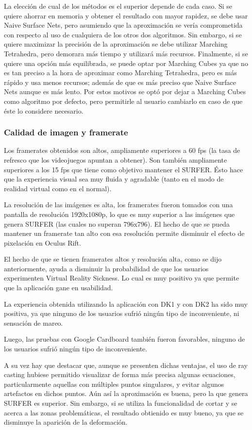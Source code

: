 \documentclass[12pt]{article}
\begin{document}
La elección de cual de los métodos es el superior depende de cada caso. Si se quiere ahorrar en memoria y obtener el resultado con mayor rapidez, se debe usar Naive Surface Nets, pero asumiendo que la aproximación se vería comprometida con respecto al uso de cualquiera de los otros dos algoritmos. Sin embargo, si se quiere maximizar la precisión de la aproximación se debe utilizar Marching Tetrahedra, pero demorara más tiempo y utilizará más recursos. Finalmente, si se quiere una opción más equilibrada, se puede optar por Marching Cubes ya que no es tan preciso a la hora de aproximar como Marching Tetrahedra, pero es más rápido y usa menos recursos; además de que es más preciso que Naive Surface Nets aunque es más lento. Por estos motivos se optó por dejar a Marching Cubes como algoritmo por defecto, pero permitirle al usuario cambiarlo en caso de que éste lo considere necesario.
\subsubsection{Calidad de imagen y framerate}
Los framerates obtenidos son altos, ampliamente superiores a 60 fps (la tasa de refresco que los videojuegos apuntan a obtener). Son también ampliamente superiores a los 15 fps que tiene como objetivo mantener el SURFER. Ésto hace que la experiencia visual sea muy fluida y agradable (tanto en el modo de realidad virtual como en el normal). 

La resolución de las imágenes es alta, los framerates fueron tomados con una pantalla de resolución 1920x1080p, lo que es muy superior a las imágenes que genera SURFER (las cuales no superan 796x796). El hecho de que se pueda mantener un framerate tan alto con esa resolución permite disminuir el efecto de pixelación en Oculus Rift. 

El hecho de que se tienen framerates altos y resolución alta, como se dijo anteriormente, ayuda a disminuir la probabilidad de que los usuarios experimenten Virtual Reality Sickness. Lo cual es muy positivo ya que permite que la aplicación gane en usabilidad.

La experiencia obtenida utilizando la aplicación con DK1 y con DK2 ha sido muy positiva, ya que ninguno de los usuarios sufrió ningún tipo de inconveniente, ni sensación de mareo. 

Luego, las pruebas con Google Cardboard también fueron favorables, ninguno de los usuarios sufrió ningún tipo de inconveniente.

A su vez hay que destacar que, aunque se presenten dichas ventajas, el uso de ray casting hubiese permitido visualizar de forma más precisa algunas ecuaciones, particularmente aquellas con múltiples puntos singulares, y evitar algunos artefactos en dichos puntos. Aún así la aproximación es buena, pero la que genera SURFER es superior. Sin embargo, si se utiliza la funcionalidad de cortar y se acerca a las zonas problemáticas, el resultado obtienido es muy bueno, ya que se disminuye la aparición de la deformación.
\end{document}
